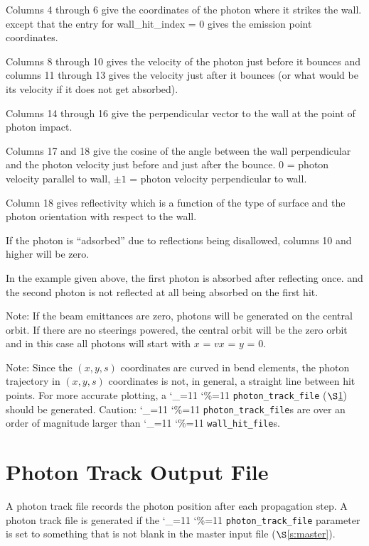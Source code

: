 \documentclass[11pt,openany]{report}
\newcommand{\sref}[1]{$\S$\ref{#1}}
\newcommand\ttcmd{\begingroup\catcode`\_=11 \catcode`\%=11 \dottcmd}
\newcommand\dottcmd[1]{\texttt{#1}\endgroup}
\newcommand{\vn}{\ttcmd}
\begin{document}
{{{Columns 4 through 6 give the coordinates of the photon where it strikes the wall.  except
that the entry for wall_hit_index = 0 gives the emission point coordinates.

Columns 8 through 10 gives the velocity of the photon just before it bounces and columns 11
through 13 gives the velocity just after it bounces (or what would be its velocity if it
does not get absorbed).

Columns 14 through 16 give the perpendicular vector to the wall at the point of photon
impact.

Columns 17 and 18 give the cosine of the angle between the wall perpendicular and the
photon velocity just before and just after the bounce. 0 = photon velocity parallel to wall,
$\pm 1$ = photon velocity perpendicular to wall.

Column 18 gives reflectivity which is a function of the type of surface and the photon
orientation with respect to the wall.

If the photon is ``adsorbed'' due to reflections being disallowed, columns 10 and
higher will be zero.

In the example given above, the first photon is absorbed after reflecting once.
and the second photon is not reflected at all being absorbed on the first hit.

Note: If the beam emittances are zero, photons will be generated on
the central orbit. If there are no steerings powered, the central
orbit will be the zero orbit and in this case all photons will start
with $x$ = $vx$ = $y$ = 0.

Note: Since the $(x,y,s)$ coordinates are curved in bend elements, the photon trajectory
in $(x,y,s)$ coordinates is not, in general, a straight line between hit points. For more
accurate plotting, a \vn{photon_track_file} (\sref{s:photon.track.file}) should be
generated. Caution: \vn{photon_track_file}s are over an order of magnitude larger than
\vn{wall_hit_file}s.

\section{Photon Track Output File}
\label{s:photon.track.file}

A photon track file records the photon position after each propagation step.  A photon
track file is generated if the \vn{photon_track_file} parameter is set to something that
is not blank in the master input file (\sref{s:master}). 

}}}
\end{document}
